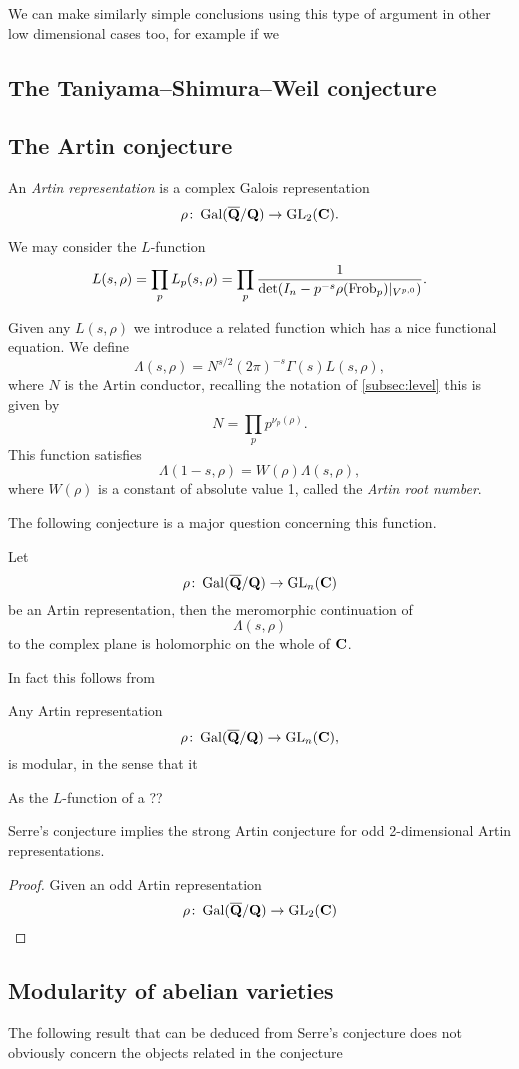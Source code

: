 \documentclass[a4paper,12pt]{article}
\begin{document}
We can make similarly simple conclusions using this type of argument in other low dimensional cases too, for example if we 


\subsection{The Taniyama--Shimura--Weil conjecture}\label{sec:tan}


\subsection{The Artin conjecture}\label{sec:artin}
\begin{defn}
An \emph{Artin representation} is a complex Galois representation
\[
\rho\colon \operatorname{Gal}(\overline{\mathbf{Q}}/\mathbf{Q}) \to \operatorname{GL}_2(\mathbf{C}).
\]
\end{defn}

We may consider the $L$-function
\[
L(s, \rho) = \prod_{p} L_p(s,\rho) = \prod_{p} \frac{1}{\det(I_n - p^{-s}\rho(\operatorname{Frob}_p) |_{V^{p,0}})}.
\]

Given any $L(s,\rho)$ we introduce a related function which has a nice functional equation.
We define
\[
\Lambda(s, \rho) = N^{s/2} (2\pi)^{-s} \Gamma(s)L(s,\rho),
\]
where $N$ is the Artin conductor, recalling the notation of \cref{subsec:level} this is given by
\[
N = \prod_{p}p^{\nu_p(\rho)}.
\]
This function satisfies
\[
\Lambda(1-s, \rho) = W(\rho)\Lambda(s,\rho),
\]
where $W(\rho)$ is a constant of absolute value 1, called the \emph{Artin root number}.

The following conjecture is a major question concerning this function.

\begin{conjecture}
Let
\[
\rho\colon \operatorname{Gal}(\overline{\mathbf{Q}}/\mathbf{Q}) \to \operatorname{GL}_n(\mathbf{C})
\]
be an Artin representation, then the meromorphic continuation of
\[
\Lambda(s,\rho)
\]
to the complex plane is holomorphic on the whole of $\mathbf{C}$.
\end{conjecture}

In fact this follows from

\begin{conjecture}
Any Artin representation
\[
\rho\colon \operatorname{Gal}(\overline{\mathbf{Q}}/\mathbf{Q}) \to \operatorname{GL}_n(\mathbf{C}),
\]
is modular, in the sense that it
\end{conjecture}

As the $L$-function of a ??

\begin{prop}
Serre's conjecture implies the strong Artin conjecture for odd 2-dimensional Artin representations.
\end{prop}
\begin{proof}
Given an odd Artin representation
\[
\rho\colon \operatorname{Gal}(\overline{\mathbf{Q}}/\mathbf{Q})\to \operatorname{GL}_2(\mathbf{C})
\]

\end{proof}


\subsection{Modularity of abelian varieties}
The following result that can be deduced from Serre's conjecture does not obviously concern the objects related in the conjecture




\end{document}
